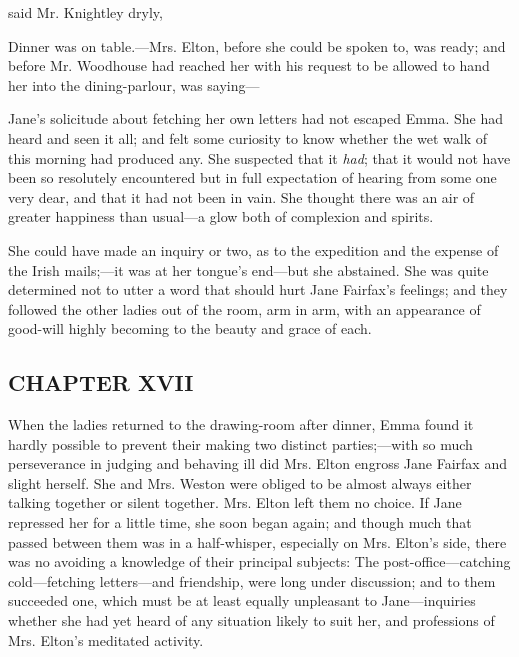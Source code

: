 
 said Mr. Knightley dryly, 

Dinner was on table.---Mrs. Elton, before she could be spoken to, was ready; and before Mr. Woodhouse had reached her with his request to be allowed to hand her into the dining-parlour, was saying---


Jane's solicitude about fetching her own letters had not escaped Emma. She had heard and seen it all; and felt some curiosity to know whether the wet walk of this morning had produced any. She suspected that it {\em had}; that it would not have been so resolutely encountered but in full expectation of hearing from some one very dear, and that it had not been in vain. She thought there was an air of greater happiness than usual---a glow both of complexion and spirits.

She could have made an inquiry or two, as to the expedition and the expense of the Irish mails;---it was at her tongue's end---but she abstained. She was quite determined not to utter a word that should hurt Jane Fairfax's feelings; and they followed the other ladies out of the room, arm in arm, with an appearance of good-will highly becoming to the beauty and grace of each.

\subsection[chapter-xvii-1]{\useURL[url36][][][]\from[url36]CHAPTER XVII}

When the ladies returned to the drawing-room after dinner, Emma found it hardly possible to prevent their making two distinct parties;---with so much perseverance in judging and behaving ill did Mrs. Elton engross Jane Fairfax and slight herself. She and Mrs. Weston were obliged to be almost always either talking together or silent together. Mrs. Elton left them no choice. If Jane repressed her for a little time, she soon began again; and though much that passed between them was in a half-whisper, especially on Mrs. Elton's side, there was no avoiding a knowledge of their principal subjects: The post-office---catching cold---fetching letters---and friendship, were long under discussion; and to them succeeded one, which must be at least equally unpleasant to Jane---inquiries whether she had yet heard of any situation likely to suit her, and professions of Mrs. Elton's meditated activity.

